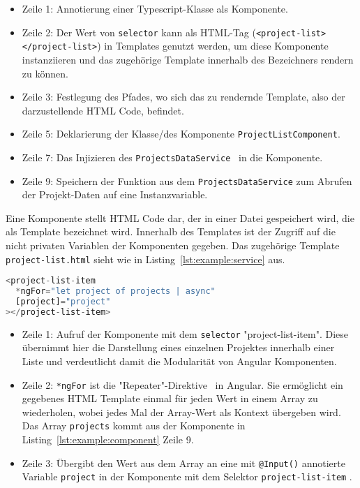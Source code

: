 \begin{itemize}
    \setlength\itemsep{-1em}
    \item Zeile 1: Annotierung einer Typescript-Klasse als Komponente.
    \item Zeile 2: Der Wert von \texttt{selector} kann als HTML-Tag (\texttt{<project-list></project-list>}) in Templates genutzt werden,
    um diese Komponente instanziieren und das zugehörige Template innerhalb des Bezeichners rendern zu können.
    \item Zeile 3: Festlegung des Pfades, wo sich das zu rendernde Template, also der darzustellende HTML Code, befindet.
    \item Zeile 5: Deklarierung der Klasse/des Komponente \texttt{ProjectListComponent}.
    \item Zeile 7: Das Injizieren des \texttt{ProjectsDataService}~\cite{angular-http} in die Komponente.
    \item Zeile 9: Speichern der Funktion aus dem \texttt{ProjectsDataService} zum Abrufen der Projekt-Daten auf eine Instanzvariable.
\end{itemize}

Eine Komponente stellt HTML Code dar, der in einer Datei gespeichert wird, die als Template bezeichnet wird.
Innerhalb des Templates ist der Zugriff auf die nicht privaten Variablen der Komponenten gegeben.
Das zugehörige Template \texttt{project-list.html} sieht wie in Listing~\ref{lst:example:service} aus.

\begin{lstlisting}[language=JavaScript,float=h!,caption={Funktion zum Abruf aller Projekte vom Server}, label={lst:example:service}]
<project-list-item
  *ngFor="let project of projects | async"
  [project]="project"
></project-list-item>
\end{lstlisting}

\begin{itemize}
    \setlength\itemsep{-1em}
    \item Zeile 1: Aufruf der Komponente mit dem \texttt{selector} "project-list-item".
    Diese übernimmt hier die Darstellung eines einzelnen Projektes innerhalb einer Liste und verdeutlicht damit
    die Modularität von Angular Komponenten.
    \item Zeile 2: \texttt{*ngFor} ist die "Repeater"-Direktive~\cite{ng-for} in Angular.
    Sie ermöglicht ein gegebenes HTML Template einmal für jeden Wert in einem Array zu wiederholen,
    wobei jedes Mal der Array-Wert als Kontext übergeben wird. Das Array \texttt{projects} kommt aus der Komponente in Listing~\ref{lst:example:component} Zeile 9.
    \item Zeile 3: Übergibt den Wert aus dem Array an eine mit \texttt{@Input()} annotierte Variable \texttt{project} in der Komponente mit dem Selektor \texttt{project-list-item} .
\end{itemize}

